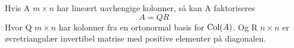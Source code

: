 Hvis A $m\times n$ har lineært uavhengige kolonner,
så kan A faktoriseres
$$A = QR$$
Hvor Q $m\times n$ har kolonner fra en ortonormal basis for $\text{Col}(A)$.
Og R $n\times n$ er øvretriangulær invertibel matrise med positive elementer
på diagonalen.

